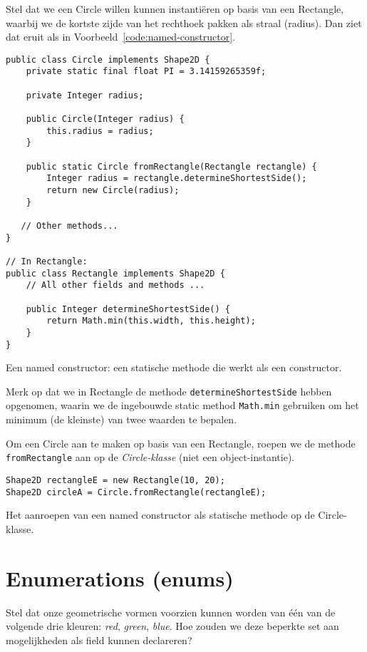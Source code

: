 \documentclass[dutch,a4paper,12pt,doubleside]{book}
\begin{document}
Stel dat we een Circle willen kunnen instantiëren op basis van een Rectangle, waarbij we 
de kortste zijde van het rechthoek pakken als straal (radius). Dan ziet dat eruit als 
in Voorbeeld~\ref{code:named-constructor}.

\begin{listing}[H]
\begin{verbatim}
public class Circle implements Shape2D {
    private static final float PI = 3.14159265359f;

    private Integer radius;

    public Circle(Integer radius) {
        this.radius = radius;
    }

    public static Circle fromRectangle(Rectangle rectangle) {
        Integer radius = rectangle.determineShortestSide();
        return new Circle(radius);
    }

   // Other methods...
}

// In Rectangle:
public class Rectangle implements Shape2D {
    // All other fields and methods ...
    
    public Integer determineShortestSide() {
        return Math.min(this.width, this.height);
    }
}
\end{verbatim}
\caption{Een named constructor: een statische methode die werkt als een constructor.}
\label{code:named-constructor}
\end{listing}

Merk op dat we in Rectangle de methode \texttt{determineShortestSide} hebben opgenomen,
waarin we de ingebouwde static method \texttt{Math.min} gebruiken om het minimum 
(de kleinste) van twee waarden te bepalen. 

Om een Circle aan te maken op basis van een Rectangle, roepen we de methode 
\texttt{fromRectangle} aan op de \emph{Circle-klasse} (niet een object-instantie).
\begin{listing}[H]
\begin{verbatim}
Shape2D rectangleE = new Rectangle(10, 20);
Shape2D circleA = Circle.fromRectangle(rectangleE);
\end{verbatim}
\caption{Het aanroepen van een named constructor als statische methode op de Circle-klasse.}
\label{code:named-constructor-invocation}
\end{listing}

\section{Enumerations (enums)}
Stel dat onze geometrische vormen voorzien kunnen worden van 
één van de volgende drie kleuren: \textit{red}, \textit{green}, \textit{blue}.
Hoe zouden we deze beperkte set aan mogelijkheden als field kunnen declareren?
\end{document}

